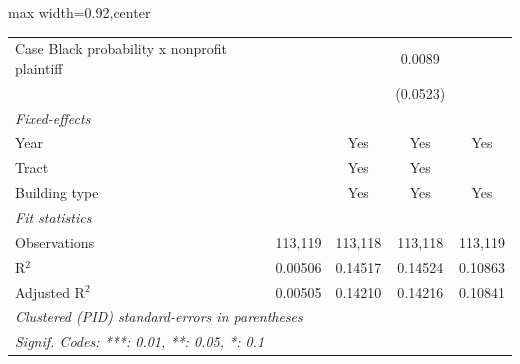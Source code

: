 \begin{table}[htbp]
\begin{adjustbox}{max width=0.92\textwidth,center}
\begin{tabular}{lcccc}
         Case Black probability x nonprofit plaintiff  &                &                 & 0.0089          &   \\   
                                                       &                &                 & (0.0523)        &   \\   
         \midrule
         \emph{Fixed-effects}\\
         Year                                          &                & Yes             & Yes             & Yes\\  
         Tract                                         &                & Yes             & Yes             & \\  
         Building type                                 &                & Yes             & Yes             & Yes\\  
         \midrule
         \emph{Fit statistics}\\
         Observations                                  & 113,119        & 113,118         & 113,118         & 113,119\\  
         R$^2$                                         & 0.00506        & 0.14517         & 0.14524         & 0.10863\\  
         Adjusted R$^2$                                & 0.00505        & 0.14210         & 0.14216         & 0.10841\\  
         \midrule \midrule
         \multicolumn{5}{l}{\emph{Clustered (PID) standard-errors in parentheses}}\\
         \multicolumn{5}{l}{\emph{Signif. Codes: ***: 0.01, **: 0.05, *: 0.1}}\\
      \end{tabular}
   \end{adjustbox}
\end{table}


